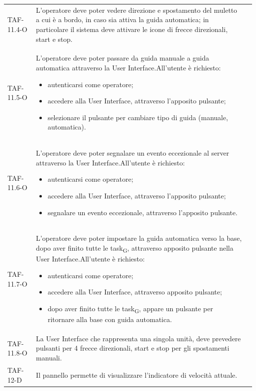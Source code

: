 \begin{longtable}{ >{\centering}p{} >{}p{}
		>{\centering}p{}}
	TAF-11.4-O & L'operatore deve poter vedere direzione e spostamento del muletto a cui è a bordo, in caso sia attiva la guida automatica; in particolare il sistema deve attivare le icone di frecce direzionali, start e stop.  & 0\tabularnewline
	
	TAF-11.5-O & L'operatore deve poter passare da guida manuale a guida automatica attraverso la User Interface.\newline All'utente è richiesto: \begin{itemize} \item autenticarsi come operatore; \item accedere alla User Interface, attraverso l'apposito pulsante; \item selezionare il pulsante per cambiare tipo di guida (manuale, automatica). \end{itemize} & 0\tabularnewline
	
	TAF-11.6-O & L'operatore deve poter segnalare un evento eccezionale al server attraverso la User Interface.\newline All'utente è richiesto: \begin{itemize} \item autenticarsi come operatore; \item accedere alla User Interface, attraverso l'apposito pulsante; \item segnalare un evento eccezionale, attraverso l'apposito pulsante.\end{itemize} & 0\tabularnewline
	
	TAF-11.7-O & L'operatore deve poter impostare la guida automatica verso la base, dopo aver finito tutte le \gls{task}\textsubscript{G}, attraverso apposito pulsante nella User Interface.\newline All'utente è richiesto: \begin{itemize} \item autenticarsi come operatore; \item accedere alla User Interface, attraverso apposito pulsante; \item dopo aver finito tutte le \gls{task}\textsubscript{G}, appare un pulsante per ritornare alla base con guida automatica.\end{itemize} & 0\tabularnewline
	
	TAF-11.8-O & La User Interface che rappresenta una singola unità, deve prevedere pulsanti per 4 frecce direzionali, start e stop per gli spostamenti manuali. & 0\tabularnewline
	
	TAF-12-D & Il pannello permette di visualizzare l'indicatore di velocità attuale. & 0\tabularnewline
	

\end{longtable}
